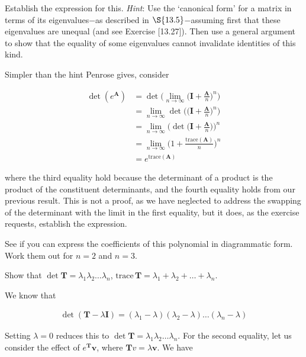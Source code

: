\documentclass[../the-road-to-reality.tex]{subfiles}
\begin{document}
\begin{questions}
\question Establish the expression for this. \textit{Hint}: Use the `canonical form' for a matrix in terms of its eigenvalues$-$as described in $\S{13.5}$$-$assuming first that these eigenvalues are unequal (and see Exercise [13.27]). Then use a general argument to show that the equality of some eigenvalues cannot invalidate identities of this kind.

\begin{solution}
        Simpler than the hint Penrose gives, consider

        \begin{align*}
                \det({e^{\mathbf{A}}}) &= \det\Big(\lim_{n\to\infty}\Big(\mathbf{I} + \frac{\mathbf{A}}{n}\Big)^n\Big) \\
                &= \lim_{n\to\infty}\det\Big(\Big(\mathbf{I} + \frac{\mathbf{A}}{n}\Big)^n\Big) \\
                &= \lim_{n\to\infty}\Big(\det\Big(\mathbf{I} + \frac{\mathbf{A}}{n}\Big)\Big)^n \\
                &= \lim_{n\to\infty}\Big(1 + \frac{\mathrm{trace}(\mathbf{A})}{n}\Big)^n \\
                &= e^{\mathrm{trace}(\mathbf{A})}
        \end{align*}

        where the third equality hold because the determinant of a product is the product of the constituent determinants, and the fourth equality holds from our previous result. This is not a proof, as we have neglected to address the swapping of the determinant with the limit in the first equality, but it does, as the exercise requests, establish the expression.
\end{solution}

\question See if you can express the coefficients of this polynomial in diagrammatic form. Work them out for $n=2$ and $n=3$.

\question Show that $\det{\mathbf{T}} = \lambda_1\lambda_2\dots\lambda_n$, $\mathrm{trace}\,\mathbf{T}=\lambda_1+\lambda_2+\dots+\lambda_n$.

\begin{solution}
        We know that

        \begin{align*}
                \det(\mathbf{T} - \lambda\mathbf{I}) = (\lambda_1-\lambda)(\lambda_2-\lambda)\dots(\lambda_n-\lambda)
        \end{align*}

        Setting $\lambda = 0$ reduces this to $\det\mathbf{T} = \lambda_1\lambda_2\dots\lambda_n$. For the second equality, let us consider the effect of $e^\mathbf{T}\mathbf{v}$, where $\mathbf{T}v=\lambda\mathbf{v}$. We have


\end{solution}
\end{questions}
\end{document}

